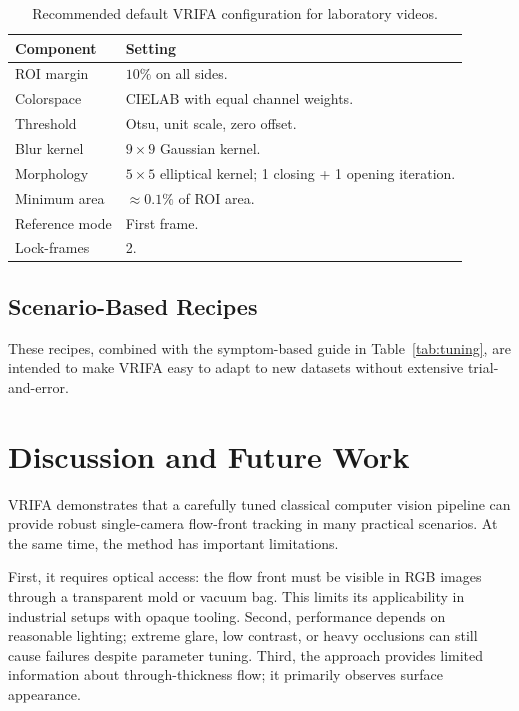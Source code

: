 \documentclass[twocolumn, 10pt]{article}
\begin{document}
\begin{table}[!t]
    \centering
    \caption{Recommended default VRIFA configuration for laboratory videos.}
    \label{tab:default_recipe}
    \begin{tabular}{@{}ll@{}}
        \toprule
        \textbf{Component} & \textbf{Setting} \\
        \midrule
        ROI margin &
        $10\%$ on all sides. \\
        Colorspace &
        CIELAB with equal channel weights. \\
        Threshold &
        Otsu, unit scale, zero offset. \\
        Blur kernel &
        $9 \times 9$ Gaussian kernel. \\
        Morphology &
        $5 \times 5$ elliptical kernel; 1 closing + 1 opening iteration. \\
        Minimum area &
        $\approx 0.1\%$ of ROI area. \\
        Reference mode &
        First frame. \\
        Lock-frames &
        2. \\
        \bottomrule
    \end{tabular}
\end{table}

\subsection{Scenario-Based Recipes}
These recipes, combined with the symptom-based guide in Table~\ref{tab:tuning}, are intended to make VRIFA easy to adapt to new datasets without extensive trial-and-error.

\section{Discussion and Future Work}
\label{sec:discussion}

VRIFA demonstrates that a carefully tuned classical computer vision pipeline can provide robust single-camera flow-front tracking in many practical scenarios. At the same time, the method has important limitations.

First, it requires optical access: the flow front must be visible in RGB images through a transparent mold or vacuum bag. This limits its applicability in industrial setups with opaque tooling. Second, performance depends on reasonable lighting; extreme glare, low contrast, or heavy occlusions can still cause failures despite parameter tuning. Third, the approach provides limited information about through-thickness flow; it primarily observes surface appearance.
\end{document}

